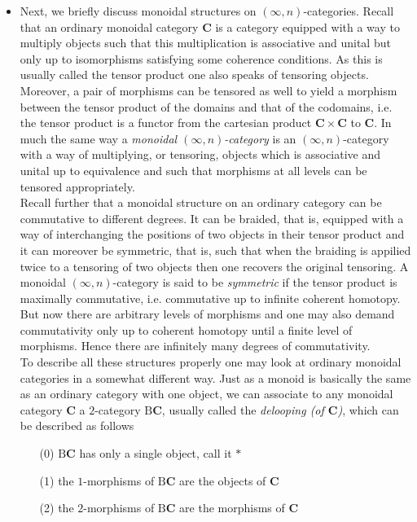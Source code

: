 \begin{itemize}
\item
Next, we briefly discuss monoidal structures on $(\infty,n)$-categories. Recall that an ordinary monoidal category $\mathbf{C}$ is a category equipped with a way to multiply objects such that this multiplication is associative and unital but only up to isomorphisms satisfying some coherence conditions. As this is usually called the tensor product one also speaks of tensoring objects. Moreover, a pair of morphisms can be tensored as well to yield a morphism between the tensor product of the domains and that of the codomains, i.e. the tensor product is a functor from the cartesian product $\mathbf{C} \times \mathbf{C}$ to $\mathbf{C}$. In much the same way a \textit{monoidal $(\infty,n)$-category} is an $(\infty,n)$-category with a way of multiplying, or tensoring, objects which is associative and unital up to equivalence and such that morphisms at all levels can be tensored appropriately.
\\
Recall further that a monoidal structure on an ordinary category can be commutative to different degrees. It can be braided, that is, equipped with a way of interchanging the positions of two objects in their tensor product and it can moreover be symmetric, that is, such that when the braiding is appilied twice to a tensoring of two objects then one recovers the original tensoring. A monoidal $(\infty,n)$-category is said to be \textit{symmetric} if the tensor product is {\glqq}maximally commutative{\grqq}, i.e. commutative up to infinite coherent homotopy. But now there are arbitrary levels of morphisms and one may also demand commutativity only up to coherent homotopy until a finite level of morphisms. Hence there are infinitely many degrees of commutativity.
\\
To describe all these structures properly one may look at ordinary monoidal categories in a somewhat different way. Just as a monoid is basically the same as an ordinary category with one object, we can associate to any monoidal category $\mathbf{C}$ a $2$-category $\mathrm{B}\mathbf{C}$, usually called the \textit{delooping (of $\mathbf{C}$)}, which can be described as follows
\begin{enumerate}
\item[(0)]
$\mathrm{B}\mathbf{C}$ has only a single object, call it $\ast$

\item[(1)]
the $1$-morphisms of $\mathrm{B}\mathbf{C}$ are the objects of $\mathbf{C}$

\item[(2)]
the $2$-morphisms of $\mathrm{B}\mathbf{C}$ are the morphisms of $\mathbf{C}$


\end{enumerate}
\end{itemize}
